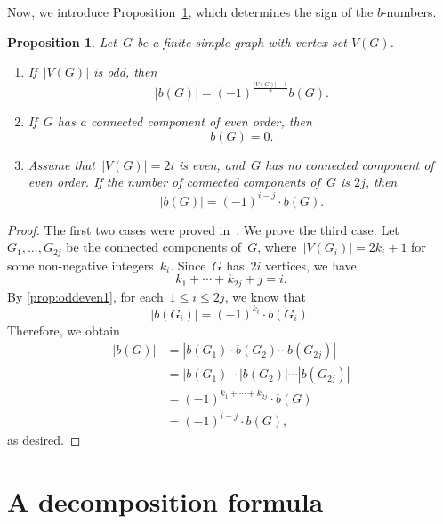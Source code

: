 \documentclass[10pt]{amsart}
\theoremstyle{plain}
\newtheorem{proposition}[theorem]{Proposition}
\numberwithin{equation}{section}
\theoremstyle{definition}
\begin{document}
Now, we introduce Proposition~\ref{prop:oddeven}, which determines the sign of the $b$-numbers.
\begin{proposition}\label{prop:oddeven}
Let~$G$ be a finite simple graph with vertex set $V(G)$.
\begin{enumerate}
  \item\label{prop:oddeven1} If~$\left\vert V(G) \right\vert$ is odd, then
  \[
    \left\vert b(G) \right\vert = (-1)^{\frac{\left\vert V(G) \right\vert -1}{2}} b(G).
  \]
  
  \item\label{prop:oddeven2} If~$G$ has a connected component of even order, then
  \[
    b(G) = 0.
  \]
  
  \item\label{prop:oddeven3} Assume that~$\left\vert V(G) \right\vert = 2i$ is even, and~$G$ has no connected component of even order.
      If the number of connected components of~$G$ is $2j$, then
  \[
    \left\vert b(G) \right\vert = (-1)^{i-j} \cdot b(G).
  \]
\end{enumerate}
\end{proposition}

\begin{proof}
    The first two cases were proved in~\cite{Choi-Park2015}.
    We prove the third case.
    Let~$G_1, \ldots, G_{2j}$ be the connected components of~$G$, where~$\left\vert V(G_i) \right\vert = 2k_i + 1$ for some non-negative integers~$k_i$.
    Since~$G$ has~$2i$ vertices, we have
    $$
    k_1+ \cdots + k_{2j} + j= i.
    $$
    By \eqref{prop:oddeven1}, for each~$1 \leq i \leq 2j$, we know that
    $$
    \left\vert b(G_i) \right\vert = (-1)^{k_i} \cdot b(G_i).
    $$
    Therefore, we obtain
    \begin{align*}
      \left\vert b(G) \right\vert & =\left\vert b(G_1) \cdot b(G_2) \cdots b(G_{2j}) \right\vert \\
       & =\left\vert b(G_1) \right\vert \cdot \left\vert b(G_2) \right\vert  \cdots \left\vert b(G_{2j}) \right\vert \\
       & = (-1)^{k_1+\cdots+k_{2j}} \cdot b(G) \\
       & = (-1)^{i-j} \cdot b(G),
    \end{align*}
    as desired.
    \end{proof}

\section{A decomposition formula}\label{sec:decom}
\end{document}
